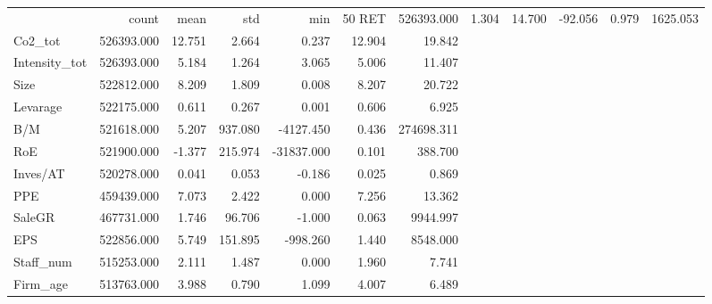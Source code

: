 \begin{tabular}{lrrrrrr}
\toprule
 & count & mean & std & min & 50%
\midrule
RET & 526393.000 & 1.304 & 14.700 & -92.056 & 0.979 & 1625.053 \\
Co2_tot & 526393.000 & 12.751 & 2.664 & 0.237 & 12.904 & 19.842 \\
Intensity_tot & 526393.000 & 5.184 & 1.264 & 3.065 & 5.006 & 11.407 \\
Size & 522812.000 & 8.209 & 1.809 & 0.008 & 8.207 & 20.722 \\
Levarage & 522175.000 & 0.611 & 0.267 & 0.001 & 0.606 & 6.925 \\
B/M & 521618.000 & 5.207 & 937.080 & -4127.450 & 0.436 & 274698.311 \\
RoE & 521900.000 & -1.377 & 215.974 & -31837.000 & 0.101 & 388.700 \\
Inves/AT & 520278.000 & 0.041 & 0.053 & -0.186 & 0.025 & 0.869 \\
PPE & 459439.000 & 7.073 & 2.422 & 0.000 & 7.256 & 13.362 \\
SaleGR & 467731.000 & 1.746 & 96.706 & -1.000 & 0.063 & 9944.997 \\
EPS & 522856.000 & 5.749 & 151.895 & -998.260 & 1.440 & 8548.000 \\
Staff_num & 515253.000 & 2.111 & 1.487 & 0.000 & 1.960 & 7.741 \\
Firm_age & 513763.000 & 3.988 & 0.790 & 1.099 & 4.007 & 6.489 \\
\bottomrule
\end{tabular}
